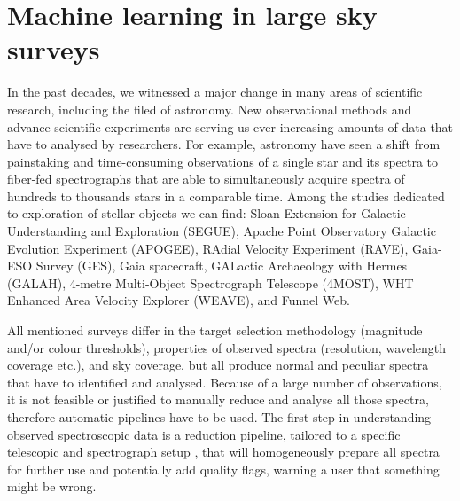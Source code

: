 \section{Machine learning in large sky surveys}
In the past decades, we witnessed a major change in many areas of scientific research, including the filed of astronomy. New observational methods and advance scientific experiments are serving us ever increasing amounts of data that have to analysed by researchers. For example, astronomy have seen a shift from painstaking and time-consuming observations of a single star and its spectra to fiber-fed spectrographs that are able to simultaneously acquire spectra of hundreds to thousands stars in a comparable time. Among the studies dedicated to exploration of stellar objects we can find: Sloan Extension for Galactic Understanding and Exploration (SEGUE), Apache Point Observatory Galactic Evolution Experiment (APOGEE), RAdial Velocity Experiment (RAVE), Gaia-ESO Survey (GES), Gaia spacecraft, GALactic Archaeology with Hermes (GALAH), 4-metre Multi-Object Spectrograph Telescope (4MOST), WHT Enhanced Area Velocity Explorer (WEAVE), and Funnel Web.

All mentioned surveys differ in the target selection methodology (magnitude and/or colour thresholds), properties of observed spectra (resolution, wavelength coverage etc.), and sky coverage, but all produce normal and peculiar spectra that have to identified and analysed. Because of a large number of observations, it is not feasible or justified to manually reduce and analyse all those spectra, therefore automatic pipelines have to be used. The first step in understanding observed spectroscopic data is a reduction pipeline, tailored to a specific telescopic and spectrograph setup \cite{2017MNRAS.464.1259K, 2019arXiv191202905A, 2020arXiv200204377S}, that will homogeneously prepare all spectra for further use and potentially add quality flags, warning a user that something might be wrong.

